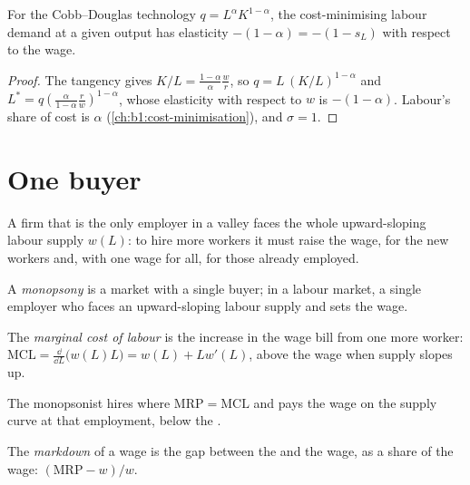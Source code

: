 \begin{proposition}\label{prop:b1:factor-markets:substitution}
For the Cobb--Douglas technology $q = L^{\alpha}K^{1-\alpha}$, the cost-minimising labour
demand at a given output has elasticity $-(1 - \alpha) = -(1 - s_L)$ with respect
to the wage.
\end{proposition}

\begin{proof}
The tangency gives $K/L = \frac{1 - \alpha}{\alpha}\frac wr$, so $q = L\,(K/L)^{1-\alpha}$ and
$L^* = q\left(\frac{\alpha}{1 - \alpha}\frac rw\right)^{1-\alpha}$, whose elasticity with respect to $w$ is $-(1 - \alpha)$.
Labour's share of cost is $\alpha$ (\cref{ch:b1:cost-minimisation}), and $\sigma = 1$.
\end{proof}

\section{One buyer}\label{sec:b1:factor-markets:monopsony}

A firm that is the only employer in a valley faces the whole upward-sloping
labour supply $w(L)$: to hire more workers it must raise the wage, for the
new workers and, with one wage for all, for those already employed.

\begin{definition}[Monopsony]\label{def:b1:factor-markets:monopsony}
A \emph{monopsony} is a market with a single buyer; in a labour market, a
single employer who faces an upward-sloping labour supply and sets the
wage.
\end{definition}

\begin{definition}\label{def:b1:factor-markets:mcl}
The \emph{marginal cost of labour} is the increase in the wage bill from one
more worker: $\mathrm{MCL} = \frac{\dd}{\dd L}\bigl(w(L)L\bigr) = w(L) + Lw'(L)$, above the wage when supply
slopes up.
\end{definition}

The monopsonist hires where $\mathrm{MRP} = \mathrm{MCL}$ and pays the wage on the supply
curve at that employment, below the .

\begin{definition}[Markdown]\label{def:b1:factor-markets:markdown}
The \emph{markdown} of a wage is the gap between the  and the wage, as a share of the wage: $(\mathrm{MRP} - w)/w$.
\end{definition}

